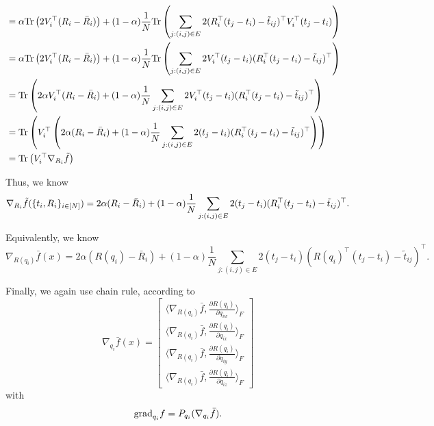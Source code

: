 \begin{align}
    \\
    &= \alpha \text{Tr}\left( 2V_i^\top (R_i-\bar{R}_i)\right) + (1-\alpha) \frac{1}{N} \text{Tr}\left( \sum_{j:(i,j)\in E} 2(R_i^\top(t_j-t_i)-\tilde{t}_{ij})^\top V_i^\top(t_j-t_i) \right)
    \\
    &= \alpha \text{Tr}\left( 2V_i^\top (R_i-\bar{R}_i)\right) + (1-\alpha) \frac{1}{N} \text{Tr}\left( \sum_{j:(i,j)\in E} 2 V_i^\top(t_j-t_i) (R_i^\top(t_j-t_i)-\tilde{t}_{ij})^\top \right)
    \\
    &= \text{Tr}\left( 2\alpha V_i^\top (R_i-\bar{R}_i) + (1-\alpha) \frac{1}{N} \sum_{j:(i,j)\in E} 2 V_i^\top(t_j-t_i) (R_i^\top(t_j-t_i)-\tilde{t}_{ij})^\top \right)
    \\
    &= \text{Tr}\left( V_i^\top \left( 2\alpha (R_i-\bar{R}_i) + (1-\alpha) \frac{1}{N} \sum_{j:(i,j)\in E} 2 (t_j-t_i) (R_i^\top(t_j-t_i)-\tilde{t}_{ij})^\top \right) \right)
    \\
    &= \text{Tr}\left( V_i^\top \nabla_{R_i} \tilde{f} \right)
\end{align}

Thus, we know
\begin{equation}
    \nabla_{R_i} \tilde{f}(\{t_i, R_i\}_{i\in[N]})
    = 2\alpha (R_i-\bar{R}_i) + (1-\alpha) \frac{1}{N} \sum_{j:(i,j)\in E} 2 (t_j-t_i) (R_i^\top(t_j-t_i)-\tilde{t}_{ij})^\top.
\end{equation}

Equivalently, we know
\begin{equation}
    \nabla_{R(q_i)} \bar{f}(x)
    = 2\alpha (R(q_i)-\bar{R}_i) + (1-\alpha) \frac{1}{N} \sum_{j:(i,j)\in E} 2 (t_j-t_i) (R(q_i)^\top(t_j-t_i)-\tilde{t}_{ij})^\top.
\end{equation}

Finally, we again use chain rule, according to
\begin{equation}
    \nabla_{q_i} \bar{f}(x) = \begin{bmatrix}
        \langle \nabla_{R(q_i)} \bar{f}, \frac{\partial R(q_i)}{\partial q_{iw}} \rangle_F
        \\
        \langle \nabla_{R(q_i)} \bar{f}, \frac{\partial R(q_i)}{\partial q_{ix}} \rangle_F
        \\
        \langle \nabla_{R(q_i)} \bar{f}, \frac{\partial R(q_i)}{\partial q_{iy}} \rangle_F
        \\
        \langle \nabla_{R(q_i)} \bar{f}, \frac{\partial R(q_i)}{\partial q_{iz}} \rangle_F
    \end{bmatrix}
\end{equation}
with
\begin{equation}
    \text{grad}_{q_i} f = P_{q_i} (\nabla_{q_i} \bar{f}).
\end{equation}


